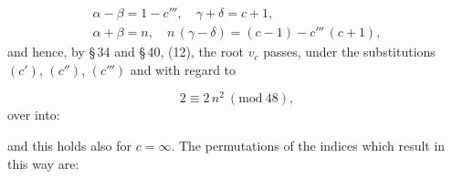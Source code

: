 
\[
\begin{gathered}
\alpha - \beta = 1 - c''', \quad \gamma + \delta = c + 1, \\
\alpha + \beta = n, \quad n\,(\gamma - \delta) = (c-1) - c'''\,(c+1),
\end{gathered}
\]
and hence, by \S\,34 and \S\,40, (12), the root $v_c$ passes, under the substitutions $(c')$, $(c'')$, $(c''')$ and with regard to

\[
2 \equiv 2\,n^2 \ (\mathrm{mod}\ 48),
\]
over into:


and this holds also for $c = \infty$. The permutations of the indices which result in this way are:

